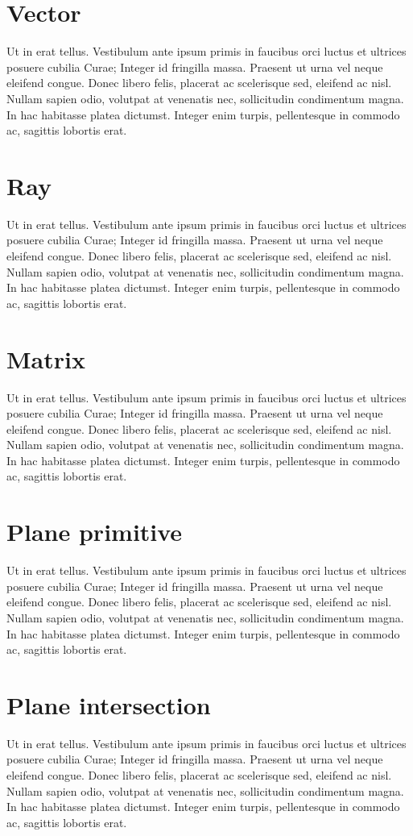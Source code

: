 \section{Vector}
Ut in erat tellus. Vestibulum ante ipsum primis in faucibus orci luctus et ultrices posuere cubilia Curae; Integer id fringilla massa. Praesent ut urna vel neque eleifend congue. Donec libero felis, placerat ac scelerisque sed, eleifend ac nisl. Nullam sapien odio, volutpat at venenatis nec, sollicitudin condimentum magna. In hac habitasse platea dictumst. Integer enim turpis, pellentesque in commodo ac, sagittis lobortis erat.
\section{Ray}
Ut in erat tellus. Vestibulum ante ipsum primis in faucibus orci luctus et ultrices posuere cubilia Curae; Integer id fringilla massa. Praesent ut urna vel neque eleifend congue. Donec libero felis, placerat ac scelerisque sed, eleifend ac nisl. Nullam sapien odio, volutpat at venenatis nec, sollicitudin condimentum magna. In hac habitasse platea dictumst. Integer enim turpis, pellentesque in commodo ac, sagittis lobortis erat.
\section{Matrix}
Ut in erat tellus. Vestibulum ante ipsum primis in faucibus orci luctus et ultrices posuere cubilia Curae; Integer id fringilla massa. Praesent ut urna vel neque eleifend congue. Donec libero felis, placerat ac scelerisque sed, eleifend ac nisl. Nullam sapien odio, volutpat at venenatis nec, sollicitudin condimentum magna. In hac habitasse platea dictumst. Integer enim turpis, pellentesque in commodo ac, sagittis lobortis erat.
\section{Plane primitive}
Ut in erat tellus. Vestibulum ante ipsum primis in faucibus orci luctus et ultrices posuere cubilia Curae; Integer id fringilla massa. Praesent ut urna vel neque eleifend congue. Donec libero felis, placerat ac scelerisque sed, eleifend ac nisl. Nullam sapien odio, volutpat at venenatis nec, sollicitudin condimentum magna. In hac habitasse platea dictumst. Integer enim turpis, pellentesque in commodo ac, sagittis lobortis erat.
\section{Plane intersection}
Ut in erat tellus. Vestibulum ante ipsum primis in faucibus orci luctus et ultrices posuere cubilia Curae; Integer id fringilla massa. Praesent ut urna vel neque eleifend congue. Donec libero felis, placerat ac scelerisque sed, eleifend ac nisl. Nullam sapien odio, volutpat at venenatis nec, sollicitudin condimentum magna. In hac habitasse platea dictumst. Integer enim turpis, pellentesque in commodo ac, sagittis lobortis erat.
